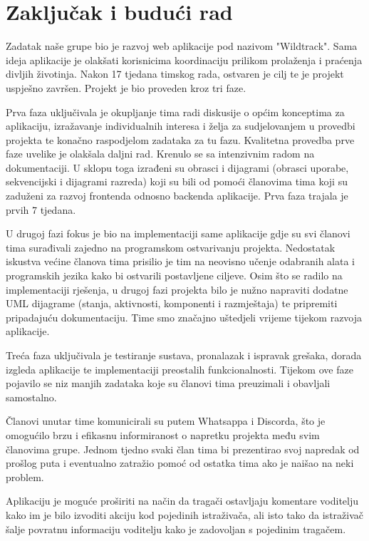 \chapter{Zaključak i budući rad}
		
		Zadatak naše grupe bio je razvoj web aplikacije pod nazivom "Wildtrack". Sama ideja aplikacije je olakšati korisnicima koordinaciju prilikom prolaženja i praćenja divljih životinja. Nakon 17 tjedana timskog rada, ostvaren je cilj te je projekt uspješno završen. Projekt je bio proveden kroz tri faze.
		
		Prva faza uključivala je okupljanje tima radi diskusije o općim konceptima za aplikaciju, izražavanje individualnih interesa i želja za sudjelovanjem u provedbi projekta te konačno raspodjelom zadataka za tu fazu. Kvalitetna provedba prve faze uvelike je olakšala daljni rad. Krenulo se sa intenzivnim radom na dokumentaciji. U sklopu toga izrađeni su obrasci i dijagrami (obrasci uporabe, sekvencijski i dijagrami razreda) koji su bili od pomoći članovima tima koji su zaduženi za razvoj frontenda odnosno backenda aplikacije. Prva faza  trajala je prvih 7 tjedana.
		
		U drugoj fazi fokus je bio na implementaciji same aplikacije gdje su svi članovi tima surađivali zajedno na programskom ostvarivanju projekta. Nedostatak iskustva većine članova tima prisilio je tim na neovisno učenje odabranih alata i programskih jezika kako bi ostvarili postavljene ciljeve. Osim što se radilo na implementaciji rješenja, u drugoj fazi projekta bilo je nužno napraviti dodatne UML dijagrame (stanja, aktivnosti, komponenti i razmještaja) te pripremiti pripadajuću dokumentaciju. Time smo značajno uštedjeli vrijeme tijekom razvoja aplikacije.
		
		Treća faza uključivala je testiranje sustava, pronalazak i ispravak grešaka, dorada izgleda aplikacije te implementaciji preostalih funkcionalnosti. Tijekom ove faze pojavilo se niz manjih zadataka koje su članovi tima preuzimali i obavljali samostalno.
		
		Članovi unutar time komunicirali su putem Whatsappa i Discorda, što je omogućilo brzu i efikasnu informiranost o napretku projekta među svim članovima grupe.
		Jednom tjedno svaki član tima bi prezentirao svoj napredak od prošlog puta i eventualno zatražio pomoć od ostatka tima ako je naišao na neki problem.
		
		Aplikaciju je moguće proširiti na način da tragači ostavljaju komentare voditelju kako im je bilo izvoditi akciju kod pojedinih istraživača, ali isto tako da istraživač šalje povratnu informaciju voditelju kako je zadovoljan s pojedinim tragačem.
		 
